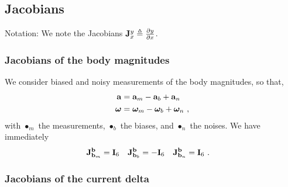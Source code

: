 %


\subsection{Jacobians}

\newcommand{\jac}[2]{{\bfJ^{#1}_{#2}}}

Notation: 
We %
note the Jacobians $\jac{y}{x}\te\dpar{y}{x}$. 



\subsubsection{Jacobians of the body magnitudes}

We consider biased and noisy measurements of the body magnitudes, so that,
%
\begin{align}
\begin{split}
{\bf a} &= {\bf a}_m - {{\bf a}_b} + {\bf a}_n \\
{{\bm \omega}} &= {{\bm \omega}}_m - {{{\bm \omega}}_b} + {{\bm \omega}}_n 
~,
\end{split}
\end{align}
%
with $\bullet_m$ the measurements, $\bullet_b$ the biases, and $\bullet_n$ the noises.
We have immediately
%
\begin{align}
\jac{\bfb}{\bfb_m}&=\bfI_6 & \jac{\bfb}{\bfb_b}&=-\bfI_6 & \jac{\bfb}{\bfb_n}&=\bfI_6
~.
\end{align}

\subsubsection{Jacobians of the current delta}
\label{sec:jac_data}

